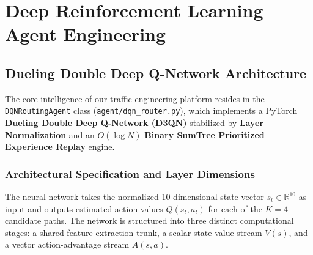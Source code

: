 \chapter{Deep Reinforcement Learning Agent Engineering}
\label{chap:agent}

\section{Dueling Double Deep Q-Network Architecture}
The core intelligence of our traffic engineering platform resides in the \texttt{DQNRoutingAgent} class (\texttt{agent/dqn\_router.py}), which implements a PyTorch \textbf{Dueling Double Deep Q-Network (D3QN)} stabilized by \textbf{Layer Normalization} and an $O(\log N)$ \textbf{Binary SumTree Prioritized Experience Replay} engine.

\subsection{Architectural Specification and Layer Dimensions}
The neural network takes the normalized 10-dimensional state vector $s_t \in \mathbb{R}^{10}$ as input and outputs estimated action values $Q(s_t, a_t)$ for each of the $K=4$ candidate paths. The network is structured into three distinct computational stages: a shared feature extraction trunk, a scalar state-value stream $V(s)$, and a vector action-advantage stream $A(s, a)$.

